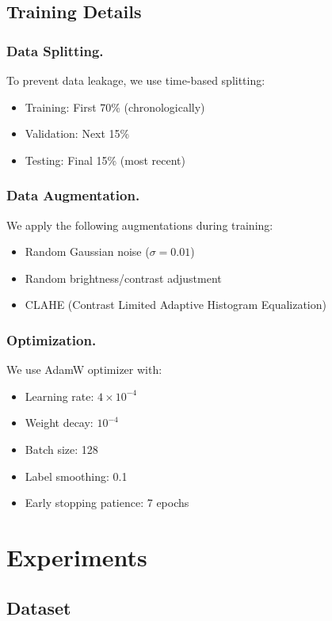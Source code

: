 \documentclass[runningheads]{llncs}
\begin{document}
\subsection{Training Details}
\label{sec:training}

\subsubsection{Data Splitting.}
To prevent data leakage, we use time-based splitting:
\begin{itemize}
    \item Training: First 70\% (chronologically)
    \item Validation: Next 15\%
    \item Testing: Final 15\% (most recent)
\end{itemize}

\subsubsection{Data Augmentation.}
We apply the following augmentations during training:
\begin{itemize}
    \item Random Gaussian noise ($\sigma = 0.01$)
    \item Random brightness/contrast adjustment
    \item CLAHE (Contrast Limited Adaptive Histogram Equalization)
\end{itemize}

\subsubsection{Optimization.}
We use AdamW optimizer with:
\begin{itemize}
    \item Learning rate: $4 \times 10^{-4}$
    \item Weight decay: $10^{-4}$
    \item Batch size: 128
    \item Label smoothing: 0.1
    \item Early stopping patience: 7 epochs
\end{itemize}


\section{Experiments}
\label{sec:experiments}

\subsection{Dataset}
\label{sec:dataset}
\end{document}
